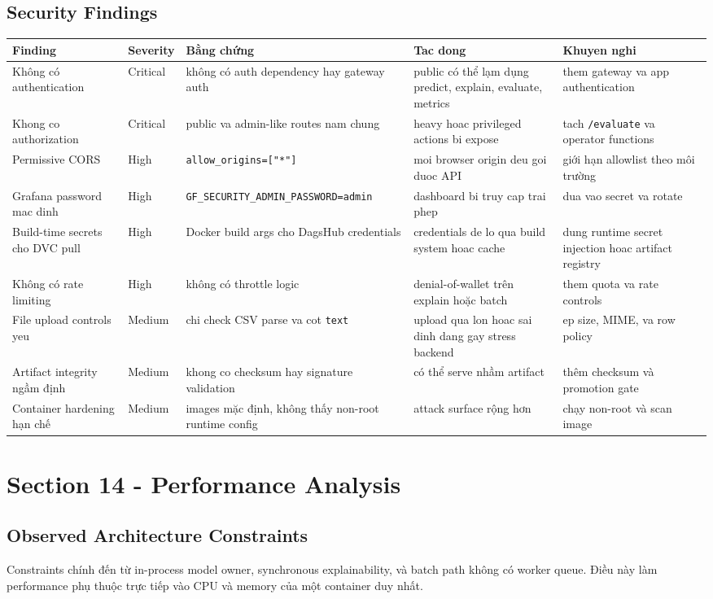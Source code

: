 \subsection{Security Findings}
\begin{longtable}{@{}p{}p{}p{}p{}p{}@{}}
\toprule
\textbf{Finding} & \textbf{Severity} & \textbf{Bằng chứng} & \textbf{Tac dong} & \textbf{Khuyen nghi} \\
\midrule
\endhead
Không có authentication & Critical & không có auth dependency hay gateway auth & public có thể lạm dụng predict, explain, evaluate, metrics & them gateway va app authentication \\
Khong co authorization & Critical & public va admin-like routes nam chung & heavy hoac privileged actions bi expose & tach \texttt{/evaluate} va operator functions \\
Permissive CORS & High & \texttt{allow\_origins=["*"]} & moi browser origin deu goi duoc API & giới hạn allowlist theo môi trường \\
Grafana password mac dinh & High & \texttt{GF\_SECURITY\_ADMIN\_PASSWORD=admin} & dashboard bi truy cap trai phep & dua vao secret va rotate \\
Build-time secrets cho DVC pull & High & Docker build args cho DagsHub credentials & credentials de lo qua build system hoac cache & dung runtime secret injection hoac artifact registry \\
Không có rate limiting & High & không có throttle logic & denial-of-wallet trên explain hoặc batch & them quota va rate controls \\
File upload controls yeu & Medium & chi check CSV parse va cot \texttt{text} & upload qua lon hoac sai dinh dang gay stress backend & ep size, MIME, va row policy \\
Artifact integrity ngầm định & Medium & khong co checksum hay signature validation & có thể serve nhầm artifact & thêm checksum và promotion gate \\
Container hardening hạn chế & Medium & images mặc định, không thấy non-root runtime config & attack surface rộng hơn & chạy non-root và scan image \\
\bottomrule
\end{longtable}

\section{Section 14 - Performance Analysis}
\subsection{Observed Architecture Constraints}
Constraints chính đến từ in-process model owner, synchronous explainability, và batch path không có worker queue. Điều này làm performance phụ thuộc trực tiếp vào CPU và memory của một container duy nhất.

